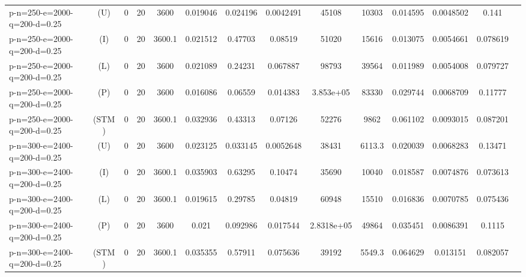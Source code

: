 \documentclass[landscape, a4paper]{article}
\newcommand{\STM}{\ensuremath{\mathrm{STM}}}
\newcommand{\Improved}{\ensuremath{\mathrm{I}}}
\newcommand{\Loose}{\ensuremath{\mathrm{L}}}
\newcommand{\Profit}{\ensuremath{\mathrm{P}}}
\newcommand{\Utility}{\ensuremath{\mathrm{U}}}
\begin{document}
\begin{center}
\begin{tabular}{lccccccccccccc}
p-n=250-e=2000-q=200-d=0.25 & (\Utility) & 0 & 20 & 3600 & 0.019046 & 0.024196 & 0.0042491 & 45108 & 10303 & 0.014595 & 0.0048502 & 0.141 & \\
p-n=250-e=2000-q=200-d=0.25 & (\Improved) & 0 & 20 & 3600.1 & 0.021512 & 0.47703 & 0.08519 & 51020 & 15616 & 0.013075 & 0.0054661 & 0.078619 & \\
p-n=250-e=2000-q=200-d=0.25 & (\Loose) & 0 & 20 & 3600 & 0.021089 & 0.24231 & 0.067887 & 98793 & 39564 & 0.011989 & 0.0054008 & 0.079727 & \\
p-n=250-e=2000-q=200-d=0.25 & (\Profit) & 0 & 20 & 3600 & 0.016086 & 0.06559 & 0.014383 & 3.853e+05 & 83330 & 0.029744 & 0.0068709 & 0.11777 & \\
p-n=250-e=2000-q=200-d=0.25 & (\STM) & 0 & 20 & 3600.1 & 0.032936 & 0.43313 & 0.07126 & 52276 & 9862 & 0.061102 & 0.0093015 & 0.087201 & \\
p-n=300-e=2400-q=200-d=0.25 & (\Utility) & 0 & 20 & 3600 & 0.023125 & 0.033145 & 0.0052648 & 38431 & 6113.3 & 0.020039 & 0.0068283 & 0.13471 & \\
p-n=300-e=2400-q=200-d=0.25 & (\Improved) & 0 & 20 & 3600.1 & 0.035903 & 0.63295 & 0.10474 & 35690 & 10040 & 0.018587 & 0.0074876 & 0.073613 & \\
p-n=300-e=2400-q=200-d=0.25 & (\Loose) & 0 & 20 & 3600.1 & 0.019615 & 0.29785 & 0.04819 & 60948 & 15510 & 0.016836 & 0.0070785 & 0.075436 & \\
p-n=300-e=2400-q=200-d=0.25 & (\Profit) & 0 & 20 & 3600 & 0.021 & 0.092986 & 0.017544 & 2.8318e+05 & 49864 & 0.035451 & 0.0086391 & 0.1115 & \\
p-n=300-e=2400-q=200-d=0.25 & (\STM) & 0 & 20 & 3600.1 & 0.035355 & 0.57911 & 0.075636 & 39192 & 5549.3 & 0.064629 & 0.013151 & 0.082057 & \\
\end{tabular}
\end{center}
\end{document}
